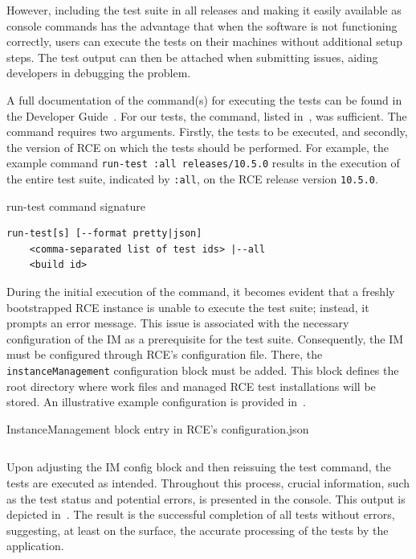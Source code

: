 However, including the test suite in all releases and making it easily available as console commands has the advantage that when the software is not functioning correctly, users can execute the tests on their machines without additional setup steps. The test output can then be attached when submitting issues, aiding developers in debugging the problem.

A full documentation of the command(s) for executing the tests can be found in the Developer Guide~\cite{rceDevGuide10x}. For our tests, the command, listed in~, was sufficient. The command requires two arguments. Firstly, the tests to be executed, and secondly, the version of \ac{RCE} on which the tests should be performed. For example, the example command \texttt{run-test :all releases/10.5.0} results in the execution of the entire test suite, indicated by \texttt{:all}, on the \ac{RCE} release version \texttt{10.5.0}.

\begin{listing}[ht]
\caption{run-test command signature}
\label{lst:run-tests-command}
\begin{verbatim}
run-test[s] [--format pretty|json] 
    <comma-separated list of test ids> |--all
    <build id>
\end{verbatim}
\end{listing}


During the initial execution of the command, it becomes evident that a freshly bootstrapped \ac{RCE} instance is unable to execute the test suite; instead, it prompts an error message. This issue is associated with the necessary configuration of the \ac{IM} as a prerequisite for the test suite. Consequently, the \ac{IM} must be configured through \ac{RCE}'s configuration file. There, the \texttt{instanceManagement} configuration block must be added. This block defines the root directory where work files and managed RCE test installations will be stored. An illustrative example configuration is provided in~.

\begin{listing}
\caption{InstanceManagement block entry in \ac{RCE}'s configuration.json}
\label{lst:configuration-json}
\inputminted{json}{files/code/configuration.json}
\end{listing}

Upon adjusting the \ac{IM} config block and then reissuing the test command, the tests are executed as intended. Throughout this process, crucial information, such as the test status and potential errors, is presented in the console. This output is depicted in~. The result is the successful completion of all tests without errors, suggesting, at least on the surface, the accurate processing of the tests by the application.

